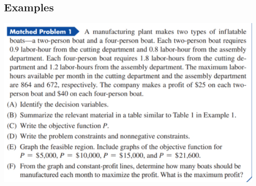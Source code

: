 \documentclass[14pt]{extarticle}
\begin{document}
\subsection{Examples}
\includegraphics[width=0.85\linewidth]{5-3_04}
\end{document}
